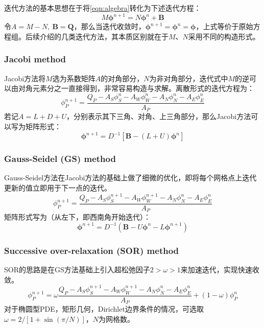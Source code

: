 \documentclass[11pt]{article}
\begin{document}
迭代方法的基本思想在于将\autoref{eqn:algebra}转化为下述迭代方程：
\begin{equation}
	M\bm{\phi}^{n+1}=N\bm{\phi}^n+\bm{B}
\end{equation}
令$A=M-N,\ \bm{B}=\bm{Q}$，那么当迭代收敛时，$\bm{\phi}^{n+1}=\bm{\phi}^n=\bm{\phi}$，上式等价于原始方程组。后续介绍的几类迭代方法，其本质区别就在于$M$、$N$采用不同的构造形式。

\subsubsection{Jacobi method}
Jacobi方法将$M$选为系数矩阵$A$的对角部分，$N$为非对角部分，迭代式中$M$的逆可以由对角元素分之一直接得到，非常容易构造与求解。离散形式的迭代方程为：
\begin{equation}
	\phi_P^{n+1}=\frac{Q_P-A_S\phi_S^n-A_W\phi_W^n-A_N\phi_N^n-A_E\phi_E^n}{A_P}
\end{equation}
若记$A=L+D+U$，分别表示其下三角、对角、上三角部分，那么Jacobi方法可以写为矩阵形式\citep{sauer_numerical_2018}：
\begin{equation}
	\bm{\phi}^{n+1}=D^{-1}\left[\bm{B}-(L+U)\bm{\phi}^n\right]
\end{equation}

\subsubsection{Gauss-Seidel (GS) method}
Gauss-Seidel方法在Jacobi方法的基础上做了细微的优化，即将每个网格点上迭代更新的值立即用于下一点的迭代。
\begin{equation}
	\phi_P^{n+1}=\frac{Q_P-A_S\phi_S^{n+1}-A_W\phi_W^{n+1}-A_N\phi_N^n-A_E\phi_E^n}{A_P}
\end{equation}
矩阵形式写为（从左下，即西南角开始迭代）：
\begin{equation}
	\bm{\phi}^{n+1}=D^{-1}\left(\bm{B}-U\bm{\phi}^n-L\bm{\phi}^{n+1}\right)
\end{equation}

\subsubsection{Successive over-relaxation (SOR) method}
SOR的思路是在GS方法基础上引入超松弛因子$2>\omega>1$来加速迭代，实现快速收敛。
\begin{equation}
	\phi_P^{n+1}=\omega\frac{Q_P-A_S\phi_S^{n+1}-A_W\phi_W^{n+1}-A_N\phi_N^n-A_E\phi_E^n}{A_P}+(1-\omega)\phi_P^n
\end{equation}
对于椭圆型PDE，矩形几何，Dirichlet边界条件的情况，可选取$\omega=2/[1+\sin{(\pi/N)}]$，$N$为网格数\citep{ferziger_computational_2020,brazier_optimum_1974}。
\end{document}
